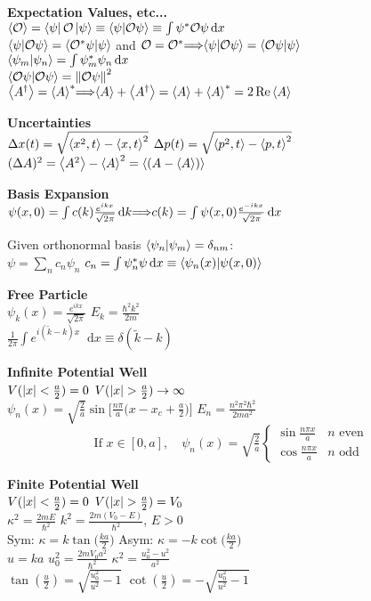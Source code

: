 \documentclass[11pt, a4paper]{article}
\newcommand{\newsec}[1]{\vspace{2mm}\textbf{#1}\\}
\newcommand{\diff}{\mathop{}\!\mathrm{d}} %
\renewcommand{\O}{\mathcal{O}}  %
\let\spaceyimplies\implies
\renewcommand{\implies}{\hspace{-1mm}\spaceyimplies\hspace{-1mm}}
\newcommand{\evb}[1]{\big \langle {#1} \big \rangle}  %
\begin{document}
\begin{multicols}{2}
\newsec{Expectation Values, etc...}
$ \ev{\O} =  \bra{\psi}\O\ket{\psi} \equiv \braket{\psi}{\O\psi} \equiv \int \psi^{*} \O \psi \diff x $\\
$ \braket{\psi}{\O \psi} = \braket{\O^{*}\psi}{\psi} $ and $ \O = \O^{*} \implies \braket{\psi}{\O\psi} = \braket{\O\psi}{\psi}$\\
$ \braket{\psi_{m}}{\psi_{n}} = \int \psi_{m}^{*}\psi_{n}\diff x $\\
$ \braket{\O\psi}{\O\psi} = \norm{\O\psi}^{2} $\\
$ \evb{A^{\dagger}} = \ev{A}^{*} \implies \ev{A} + \ev{A^{\dagger}} = \ev{A} + \ev{A}^{*} = 2 \Re \ev{A} $


\newsec{Uncertainties}
$ \Delta x(t) = \sqrt{\ev{x^{2}, t} - \ev{x, t}^{2}} $ \quad $ \Delta p(t) = \sqrt{\ev{p^{2}, t} - \ev{p, t}^{2}} $\\
$ (\Delta A)^{2} = \expval{A^{2}} - \expval{A}^{2} = \expval{(A - \expval{A})}  $


\newsec{Basis Expansion}
$ \psi(x, 0) = \int  c(k)\frac{e^{ikx}}{\sqrt{2\pi}} \diff k \implies c(k) = \int \psi(x, 0)\frac{e^{-ikx}}{\sqrt{2\pi}}\diff x  $

Given orthonormal basis $\braket{\psi_n}{\psi_m} = \delta_{nm}$: \\
$\psi= \sum_n c_n \psi_n$ \qquad $c_n = \int \psi_n^* \psi \diff x \equiv \braket{\psi_n(x)}{\psi(x, 0)}$ 

\newsec{Free Particle}
$ \psi_{k}(x) = \frac{e^{ikx}}{\sqrt{2\pi}} $ \qquad $ E_{k} = \frac{\hbar^{2}k^{2}}{2m} $\\
$ \frac{1}{2\pi} \int e^{i(\tilde{k}-k)x}\diff x \equiv \delta(\tilde{k} - k) $


\newsec{Infinite Potential Well}
$ V(\abs{x} < \frac{a}{2}) = 0 $ \qquad $ V(\abs{x} > \frac{a}{2}) \to \infty $\\
$ \psi_{n}(x) = \sqrt{\frac{2}{a}}\sin \big[\frac{n\pi}{a}\big(x - x_{c} + \frac{a}{2}\big)\big] $ \quad $ E_{n} = \frac{n^{2}\pi^{2}\hbar^{2}}{2ma^{2}} $\\[-2mm]
\[ \text{If } x \in [0, a], \quad \psi_{n}(x) =\sqrt{\tfrac{2}{a}}
\begin{cases}
	\sin \frac{n\pi x}{a} & n \text{ even}\\
	\cos \frac{n\pi x}{a} & n \text{ odd}
\end{cases}
\]

\newsec{Finite Potential Well}
$ V(\abs{x} < \frac{a}{2}) = 0 $ \qquad $ V(\abs{x} > \frac{a}{2}) = V_{0} $\\
$ \kappa^{2} = \frac{2mE}{\hbar^{2}} $ \qquad $ k^{2} = \frac{2m(V_{0} - E)}{\hbar^{2}} $, \quad $ E > 0 $\\
Sym: $ \kappa = k \tan \big(\frac{ka}{2}\big) $ \qquad Asym: $ \kappa = -k \cot \big(\frac{ka}{2}\big) $\\
$ u = ka $ \qquad $ u_{0}^{2} = \frac{2mV_{0}a^{2}}{\hbar^{2}} $ \qquad $ \kappa^{2} = \frac{u_{0}^{2} - u^{2}}{a^{2}} $\\
$ \tan(\frac{u}{2}) = \sqrt{\frac{u_{0}^{2}}{u^{2}} - 1} $ \qquad $ \cot(\frac{u}{2}) = -\sqrt{\frac{u_{0}^{2}}{u^{2}} - 1} $


\end{multicols}
\end{document}
